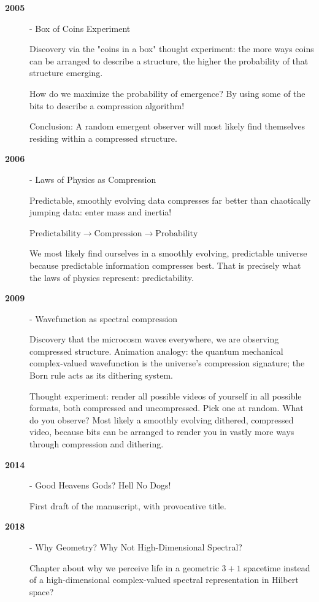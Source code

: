 \begin{description}
\item[\textbf{2005}] - Box of Coins Experiment

  Discovery via the "coins in a box" thought experiment: the more ways coins can be arranged to describe a structure, the higher the probability of that structure emerging.

  How do we maximize the probability of emergence? By using some of the bits to describe a compression algorithm!

  Conclusion: A random emergent observer will most likely find themselves residing within a compressed structure.


\item[\textbf{2006}] - Laws of Physics as Compression

  Predictable, smoothly evolving data compresses far better than chaotically jumping data: enter mass and inertia!

  \( \text{Predictability} \rightarrow \text{Compression} \rightarrow \text{Probability} \)

  We most likely find ourselves in a smoothly evolving, predictable universe because predictable information compresses best. That is precisely what the laws of physics represent: predictability.


\item[\textbf{2009}] - Wavefunction as spectral compression

  Discovery that the microcosm waves everywhere, we are observing compressed structure. 
  Animation analogy: the quantum mechanical complex-valued wavefunction is the universe's compression signature; the Born rule acts as its dithering system.

  Thought experiment: render all possible videos of yourself in all possible formats, both compressed and uncompressed. Pick one at random. What do you observe? Most likely a smoothly evolving dithered, compressed video, because bits can be arranged to render you in vastly more ways through compression and dithering.



\item[\textbf{2014}] - Good Heavens Gods? Hell No Dogs!

First draft of the manuscript, with provocative title.


\item[\textbf{2018}] - Why Geometry? Why Not High-Dimensional Spectral?

  Chapter about why we perceive life in a geometric $3+1$ spacetime instead of a high-dimensional complex-valued spectral representation in Hilbert space?



\end{description}
